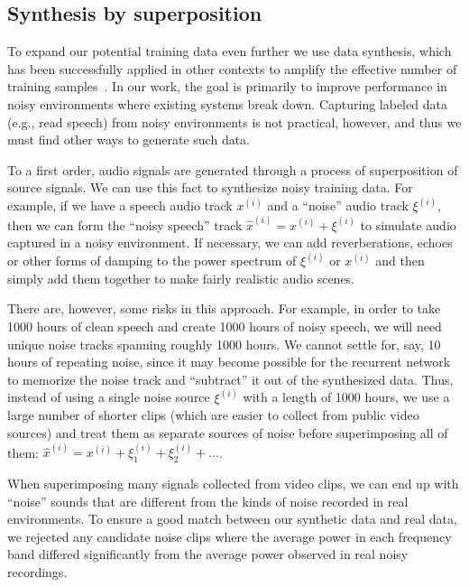\documentclass{article}
\begin{document}
\subsection{Synthesis by superposition}
\label{section:noisesynth}

To expand our potential training data even further we use data synthesis, which
has been successfully applied in other contexts to amplify the effective number
of training
samples~\cite{sapp2008synth,lecun2004learningmethods,coates2011icdar}. In our
work, the goal is primarily to improve performance in noisy environments where
existing systems break down.  Capturing labeled data (e.g., read speech) from
noisy environments is not practical, however, and thus we must find other ways
to generate such data.

To a first order, audio signals are generated through a process of
superposition of source signals.  We can use this fact to synthesize noisy
training data.  For example, if we have a speech audio track $x^{(i)}$ and a
``noise'' audio track $\xi^{(i)}$, then we can form the ``noisy speech'' track
$\hat{x}^{(i)} = x^{(i)}+\xi^{(i)}$ to simulate audio captured in a noisy
environment.  If necessary, we can add reverberations, echoes or other forms of
damping to the power spectrum of $\xi^{(i)}$ or $x^{(i)}$ and then simply add
them together to make fairly realistic audio scenes.

There are, however, some risks in this approach. For example, in order
to take 1000 hours of clean speech and create 1000 hours of noisy speech,
we will need unique noise tracks spanning roughly 1000 hours.  
We cannot settle for, say, 10 hours of
repeating noise, since it may become possible for the recurrent
network to memorize the noise track and ``subtract'' it out of the
synthesized data.  Thus, instead of using a single noise source
$\xi^{(i)}$ with a length of 1000 hours, we use a large number
of shorter clips (which are easier to collect from public video
sources) and treat them as separate sources of noise before
superimposing all of them: $\hat{x}^{(i)} = x^{(i)} + \xi_1^{(i)}
+\xi_2^{(i)} + \ldots$.

When superimposing many signals collected from video clips, we can end up with
``noise'' sounds that are different from the kinds of noise recorded in real
environments.  To ensure a good match between our synthetic data and real data,
we rejected any candidate noise clips where the average power in each frequency
band differed significantly from the average power observed in real noisy
recordings.
\end{document}
